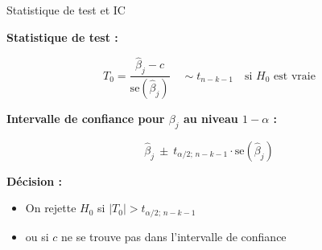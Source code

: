 \documentclass{BeamerTemplate}
\begin{document}
\begin{frame}{Statistique de test et IC}

\vspace{-0.2cm}

\textbf{Statistique de test :}

\vspace{0.2cm}

\[
T_0 = \frac{\hat{\beta}_j - c}{\text{se}(\hat{\beta}_j)} \quad \sim t_{n - k - 1} \quad \text{si } H_0 \text{ est vraie}
\]

\vspace{0.3cm}

\textbf{Intervalle de confiance pour $\beta_j$ au niveau $1 - \alpha$ :}

\vspace{0.2cm}

\[
\hat{\beta}_j \ \pm \ t_{\alpha/2; \, n-k-1} \cdot \text{se}(\hat{\beta}_j)
\]

\vspace{0.4cm}

\textbf{Décision :}

\begin{itemize}
  \item On rejette $H_0$ si $|T_0| > t_{\alpha/2; \, n-k-1}$
  \item ou si $c$ ne se trouve pas dans l’intervalle de confiance
\end{itemize}

\end{frame}
\end{document}
